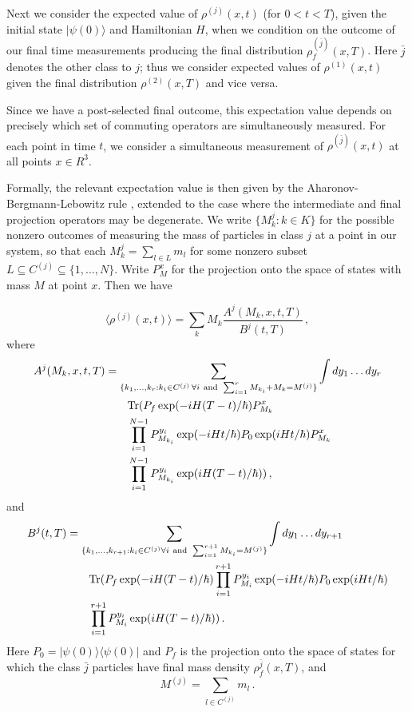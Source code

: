 \documentclass[12pt,aps,prl]{revtex4}
\def\bra#1{\langle #1 |}
\def\ket#1{| #1\rangle}
\def\Tr{{\rm Tr}}
\begin{document}
Next we consider the expected value of $\rho^{(j)}(x,t)$ (for $0 < t < T$), 
given the initial state $\ket{\psi(0)}$ and Hamiltonian $H$, 
when we condition on the outcome of our final time measurements
producing the final distribution $\rho^{(\bar{j})}_f (x,T)$. 
Here $\bar{j}$ denotes the other class to $j$; thus we consider 
expected values of $\rho^{(1)} (x,t)$ given the final distribution
$\rho^{(2)} (x, T)$ and vice versa.  

Since we have a post-selected final outcome,
this expectation value depends on precisely which set of 
commuting operators are simultaneously measured. 
For each point in time $t$, 
we consider a simultaneous measurement of $\rho^{(\bar{j})}(x,t)$ at all
points $x \in R^3$. 

Formally, the relevant expectation value is then
given by the Aharonov-Bergmann-Lebowitz
rule \cite{aharonov1964time}, extended to the case where the
intermediate and final projection operators may be degenerate.
We write $\{ M_k^j : k \in K \}$ for the possible nonzero outcomes of measuring
the mass of particles in class $j$
at a point in our system, so that each $M_k^j = \sum_{l \in L}
m_l $ for some nonzero subset $L \subseteq C^{(j)} \subseteq
\{ 1 , \ldots , N \}$. 
Write $P_M^x$ for the projection onto the space of states with
mass $M$ at point $x$.   
Then we have 

\begin{equation}
\langle \rho^{(j)} (x,t) \rangle =  \sum_k M_k 
 \frac{ A^j (M_k , x, t, T)}{B^j (t,T)} \, , 
\end{equation}
where 
\begin{align*}
A^j (M_k, x, t, T) &=
\sum_{\{ k_1 , \ldots , k_{r} : k_i \in C^{(j)} \, \forall i {\rm~and~}
\sum_{i=1}^{r} M_{k_i} + M_k =
 M^{(j)} \} } 
\int dy_1 \ldots dy_{r}\\
  &\qquad\Tr ( P_f \exp ( - i H (T-t) /
\hbar ) P_{M_k}^x \\
& \qquad \prod_{i=1}^{N-1} P_{M_{k_i}}^{y_i}
 \exp ( - i H t / \hbar ) P_0 \exp (  i H t /
\hbar ) P_{M_k}^x \\
&\qquad \prod_{i=1}^{N-1} P_{M_{k_i}}^{y_i} \exp (  i H (T-t) / \hbar )  )
\, , \nonumber 
\end{align*}
and
\begin{align*}
B^j (t,T) &= \sum_{\{ k_1 , \ldots , k_{r+1} : k_i \in C^{(j)} \forall i
  {\rm~and~}
\sum_{i=1}^{r+1} M_{k_i} =
 M^{(j)} \} }
\int dy_1 \ldots dy_{r+1} \\
& \qquad \Tr ( P_f \exp ( - i H (T-t) /
\hbar )  \prod_{i=1}^{r+1}  P_{M_i}^{y_i}  \exp ( - i H t / \hbar ) P_0 
\exp (  i H t / \hbar ) \\
& \qquad \prod_{i=1}^{r+1}  P_{M_i}^{y_i}  \exp (  i H (T-t) /
\hbar ) ) \, .  
\end{align*}
Here $P_0 = \ket{\psi (0 ) }\bra{ \psi(0)}$ and 
$P_{f}$ is the projection onto the space of states for which
the class $\bar{j}$ particles have final 
mass density $\rho_f^{\bar{j}} (x,T)$, and
$$
M^{(j)} = \sum_{l \in C^{(j)}} m_l \, .
$$
\end{document}
